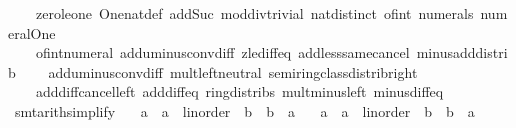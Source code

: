 \begin{isabellebody}
\ \ \ \ zero{\isacharunderscore}{\kern0pt}le{\isacharunderscore}{\kern0pt}one\ One{\isacharunderscore}{\kern0pt}nat{\isacharunderscore}{\kern0pt}def\ add{\isacharunderscore}{\kern0pt}Suc\ mod{\isacharunderscore}{\kern0pt}div{\isacharunderscore}{\kern0pt}trivial\ nat{\isachardot}{\kern0pt}distinct\ of{\isacharunderscore}{\kern0pt}int{\isacharunderscore}{\kern0pt}{}\ numerals\ numeral{\isacharunderscore}{\kern0pt}One\isanewline
\ \ \ \ of{\isacharunderscore}{\kern0pt}int{\isacharunderscore}{\kern0pt}numeral\ add{\isacharunderscore}{\kern0pt}uminus{\isacharunderscore}{\kern0pt}conv{\isacharunderscore}{\kern0pt}diff\ zle{\isacharunderscore}{\kern0pt}diff{}{\isacharunderscore}{\kern0pt}eq\ add{\isacharunderscore}{\kern0pt}less{\isacharunderscore}{\kern0pt}same{\isacharunderscore}{\kern0pt}cancel{}\ minus{\isacharunderscore}{\kern0pt}add{\isacharunderscore}{\kern0pt}distrib\isanewline
\ \ \ \ add{\isacharunderscore}{\kern0pt}uminus{\isacharunderscore}{\kern0pt}conv{\isacharunderscore}{\kern0pt}diff\ mult{\isachardot}{\kern0pt}left{\isacharunderscore}{\kern0pt}neutral\ semiring{\isacharunderscore}{\kern0pt}class{\isachardot}{\kern0pt}distrib{\isacharunderscore}{\kern0pt}right\isanewline
\ \ \ \ add{\isacharunderscore}{\kern0pt}diff{\isacharunderscore}{\kern0pt}cancel{\isacharunderscore}{\kern0pt}left{\isacharprime}{\kern0pt}\ add{\isacharunderscore}{\kern0pt}diff{\isacharunderscore}{\kern0pt}eq\ ring{\isacharunderscore}{\kern0pt}distribs\ mult{\isacharunderscore}{\kern0pt}minus{\isacharunderscore}{\kern0pt}left\ minus{\isacharunderscore}{\kern0pt}diff{\isacharunderscore}{\kern0pt}eq\isanewline
\isanewline
{}\isamarkupfalse%
\ {\isacharbrackleft}{\kern0pt}smt{\isacharunderscore}{\kern0pt}arith{\isacharunderscore}{\kern0pt}simplify{\isacharbrackright}{\kern0pt}{\isacharcolon}{\kern0pt}\isanewline
\ \ {\isacartoucheopen}{\isasymnot}\ {\isacharparenleft}{\kern0pt}a{\isacharprime}{\kern0pt}\ {\isacharcolon}{\kern0pt}{\isacharcolon}{\kern0pt}\ {\isacharprime}{\kern0pt}a\ {\isacharcolon}{\kern0pt}{\isacharcolon}{\kern0pt}\ linorder{\isacharparenright}{\kern0pt}\ {\isacharless}{\kern0pt}\ b{\isacharprime}{\kern0pt}\ {\isasymlongleftrightarrow}\ b{\isacharprime}{\kern0pt}\ {\isasymle}\ a{\isacharprime}{\kern0pt}{\isacartoucheclose}\isanewline
\ \ {\isacartoucheopen}{\isasymnot}\ {\isacharparenleft}{\kern0pt}a{\isacharprime}{\kern0pt}\ {\isacharcolon}{\kern0pt}{\isacharcolon}{\kern0pt}\ {\isacharprime}{\kern0pt}a\ {\isacharcolon}{\kern0pt}{\isacharcolon}{\kern0pt}\ linorder{\isacharparenright}{\kern0pt}\ {\isasymle}\ b{\isacharprime}{\kern0pt}\ {\isasymlongleftrightarrow}\ b{\isacharprime}{\kern0pt}\ {\isacharless}{\kern0pt}\ a{\isacharprime}{\kern0pt}{\isacartoucheclose}\isanewline

\end{isabellebody}
